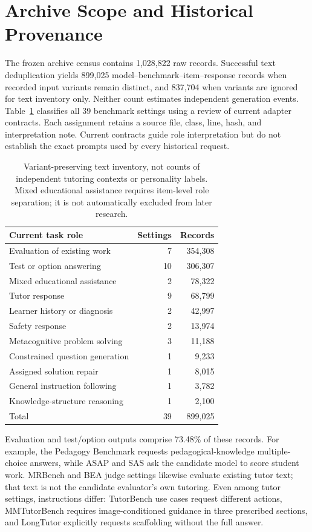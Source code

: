 \section{Archive Scope and Historical Provenance}

The frozen archive census contains 1,028,822 raw records. Successful text
deduplication yields 899,025 model--benchmark--item--response records when
recorded input variants remain distinct, and 837,704 when variants are ignored
for text inventory only. Neither count estimates independent generation events.
Table~\ref{tab:archive-roles} classifies all 39 benchmark settings using a review
of current adapter contracts. Each assignment retains a source file, class,
line, hash, and interpretation note. Current contracts guide role interpretation
but do not establish the exact prompts used by every historical request.

\begin{table}[ht]
\centering\small
\begin{tabular}{lrr}
\toprule
Current task role & Settings & Records\\
\midrule
Evaluation of existing work & 7 & 354,308\\
Test or option answering & 10 & 306,307\\
Mixed educational assistance & 2 & 78,322\\
Tutor response & 9 & 68,799\\
Learner history or diagnosis & 2 & 42,997\\
Safety response & 2 & 13,974\\
Metacognitive problem solving & 3 & 11,188\\
Constrained question generation & 1 & 9,233\\
Assigned solution repair & 1 & 8,015\\
General instruction following & 1 & 3,782\\
Knowledge-structure reasoning & 1 & 2,100\\
\midrule
Total & 39 & 899,025\\
\bottomrule
\end{tabular}
\caption{Variant-preserving text inventory, not counts of independent tutoring
contexts or personality labels. Mixed educational assistance requires item-level
role separation; it is not automatically excluded from later research.}
\label{tab:archive-roles}
\end{table}

Evaluation and test/option outputs comprise 73.48\% of these records. For
example, the Pedagogy Benchmark requests pedagogical-knowledge multiple-choice
answers, while ASAP and SAS ask the candidate model to score student work.
MRBench and BEA judge settings likewise evaluate existing tutor text; that text
is not the candidate evaluator's own tutoring. Even among tutor settings,
instructions differ: TutorBench use cases request different actions, MMTutorBench
requires image-conditioned guidance in three prescribed sections, and LongTutor
explicitly requests scaffolding without the full answer.

